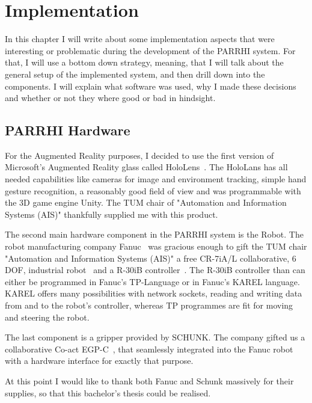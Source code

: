 \chapter{Implementation}\label{Chap:Implementation}

In this chapter I will write about some implementation aspects that were interesting or problematic during the development of the PARRHI system. For that, I will use a bottom down strategy, meaning, that I will talk about the general setup of the implemented system, and then drill down into the components. I will explain what software was used, why I made these decisions and whether or not they where good or bad in hindsight.

\section{PARRHI Hardware}
For the Augmented Reality purposes, I decided to use the first version of Microsoft's Augmented Reality glass called HoloLens~\cite{HoloLens}. The HoloLans has all needed capabilities like cameras for image and environment tracking, simple hand gesture recognition, a reasonably good field of view and was programmable with the 3D game engine Unity. The TUM chair of "Automation and Information Systems (AIS)" thankfully supplied me with this product.

The second main hardware component in the PARRHI system is the Robot. The robot manufacturing company Fanuc~\cite{Fanuc} was gracious enough to gift the TUM chair "Automation and Information Systems (AIS)" a free CR-7iA/L collaborative, 6 DOF, industrial robot~\cite{FanucCR7} and a R-30iB controller~\cite{FanucR30iB}. The R-30iB controller than can either be programmed in Fanuc's TP-Language or in Fanuc's KAREL language. KAREL offers many possibilities with network sockets, reading and writing data from and to the robot's controller, whereas TP programmes are fit for moving and steering the robot.

The last component is a gripper provided by SCHUNK. The company gifted us a collaborative Co-act EGP-C~\cite{SchunkGripper}, that seamlessly integrated into the Fanuc robot with a hardware interface for exactly that purpose. 

At this point I would like to thank both Fanuc and Schunk massively for their supplies, so that this bachelor's thesis could be realised.

